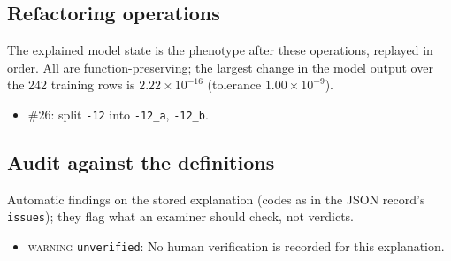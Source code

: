 \begin{drafted}
\subsection{Refactoring operations}\label{app:heart-s5-c3:operations}
The explained model state is the phenotype after these operations, replayed in order. All are function-preserving; the largest change in the model output over the 242 training rows is $2.22\times 10^{-16}$ (tolerance $1.00\times 10^{-9}$).
\begin{itemize}
\item \#26: split \texttt{-12} into \texttt{-12\_\allowbreak{}a}, \texttt{-12\_\allowbreak{}b}.
\end{itemize}
\subsection{Audit against the definitions}\label{app:heart-s5-c3:audit}
Automatic findings on the stored explanation (codes as in the JSON record's \texttt{issues}); they flag what an examiner should check, not verdicts.
\begin{itemize}
\item \textsc{warning} \texttt{unverified}: No human verification is recorded for this explanation.
\end{itemize}
\end{drafted}
